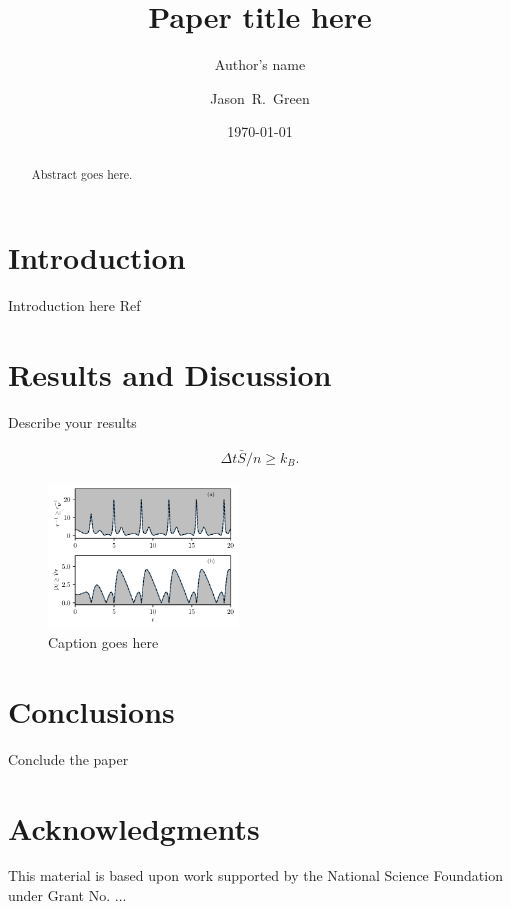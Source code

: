 \documentclass[prl,aps,reprint,noshowpacs,superscriptaddress,floatfix,letterpaper,longbibliography]{revtex4-2}
\begin{document}
	
	\title{Paper title here} 
	
	\author{Author's name}
	\author{Jason~R.~Green}
	\date{\today}
	
\begin{abstract}	
	Abstract goes here.
	\lipsum[1-1]
\end{abstract}

\maketitle

\section{Introduction}
Introduction here Ref~\cite{Nicholson2020}

\lipsum[2-3]

\section{Results and Discussion}
Describe your results

\begin{align}
\Delta t \bar S/n\geq k_B.
\end{align}

\lipsum[2-3]
\begin{figure}[h!]
	\centering
	\hspace*{-0.75cm}\includegraphics[width=0.45\textwidth]{sample-plot.pdf}
	\caption{Caption goes here}
	\label{fig:plot-label}
\end{figure}


\section{Conclusions}

Conclude the paper

\lipsum[2-3]

\section{Acknowledgments}
\begin{acknowledgments}
This material is based upon work supported by the National Science Foundation under Grant No. ...

\end{acknowledgments}
\appendix


\end{document}

